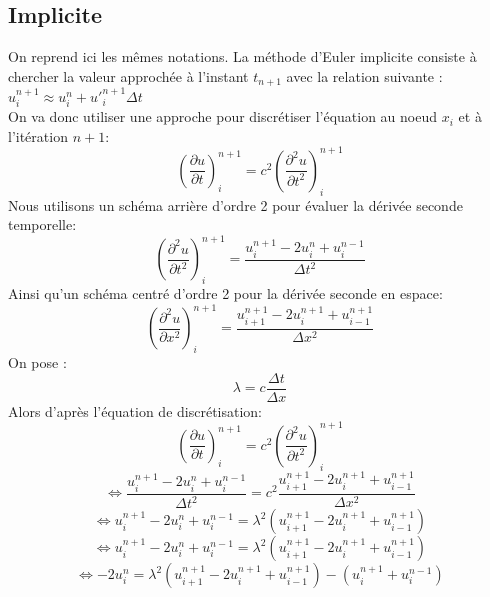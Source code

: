 \subsection{Implicite}

On reprend ici les mêmes notations. La méthode d'Euler implicite consiste à chercher la valeur approchée à l'instant $t_{n+1}$ avec la relation suivante :
$u^{n+1}_i \approx u^n_i + u'^{n+1}_i\Delta t$\\

On va donc utiliser une approche pour discrétiser l'équation au noeud $x_{i}$ et à l'itération $n+1$:\\
\begin{equation*}
(\frac{\partial u}{\partial t})^{n+1}_{i} = c^2 (\frac{\partial^2u}{\partial t^2})^{n+1}_{i}
\end{equation*}
Nous utilisons un schéma arrière d'ordre 2 pour évaluer la dérivée seconde temporelle:
\begin{equation*}
(\frac{\partial^2u}{\partial t^2})^{n+1}_{i} = \frac{u^{n+1}_{i} - 2u^{n}_{i} + u^{n-1}_{i}}{\Delta t^2}
\end{equation*}
Ainsi qu'un schéma centré d'ordre 2 pour la dérivée seconde en espace:
\begin{equation*}
(\frac{\partial^2u}{\partial x^2})^{n+1}_{i} = \frac{u^{n+1}_{i+1} - 2u^{n+1}_{i} + u^{n+1}_{i-1}}{\Delta x^2}
\end{equation*}
On pose :
\begin{equation*}
\lambda = c \frac{\Delta t}{\Delta x}
\end{equation*}
Alors d'après l'équation de discrétisation:
\begin{equation*}
(\frac{\partial u}{\partial t})^{n+1}_{i} = c^2 (\frac{\partial^2u}{\partial t^2})^{n+1}_{i}
\end{equation*}
\begin{equation*}
\Leftrightarrow\frac{u^{n+1}_{i} - 2u^{n}_{i} + u^{n-1}_{i}}{\Delta t^2} = c^2 \frac{u^{n+1}_{i+1} - 2u^{n+1}_{i} + u^{n+1}_{i-1}}{\Delta x^2}
\end{equation*}
\begin{equation*}
\Leftrightarrow u^{n+1}_{i} - 2u^{n}_{i} + u^{n-1}_{i} = \lambda ^2 (u^{n+1}_{i+1} - 2u^{n+1}_{i} + u^{n+1}_{i-1})
\end{equation*}
\begin{equation*}
\Leftrightarrow u^{n+1}_{i} - 2u^{n}_{i} + u^{n-1}_{i} = \lambda ^2 (u^{n+1}_{i+1} - 2u^{n+1}_{i} + u^{n+1}_{i-1})
\end{equation*}
\begin{equation*}
\Leftrightarrow - 2u^{n}_{i} = \lambda ^2 (u^{n+1}_{i+1} - 2u^{n+1}_{i} + u^{n+1}_{i-1}) - (u^{n+1}_{i} + u^{n-1}_{i})
\end{equation*}
